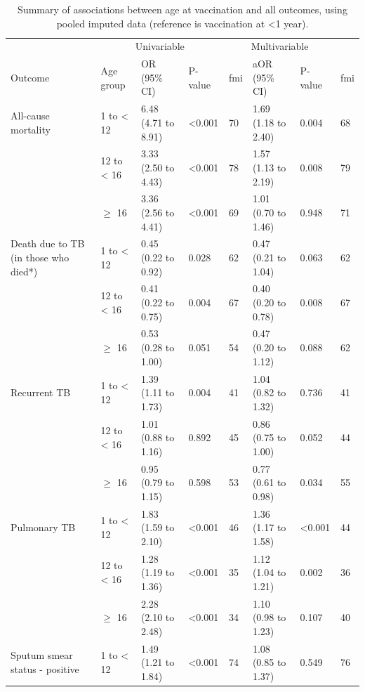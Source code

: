 \documentclass[11pt,twoside]{bristolthesis}
\begin{document}
  \begin{table}[H][H]
  
  \caption[Summary of associations between age at vaccination and all outcomes, using pooled imputed data (reference is vaccination at <1 year).]{\label{tab:06-imp-ageatvac}Summary of associations between age at vaccination and all outcomes, using pooled imputed data (reference is vaccination at <1 year).}
  \centering
  \fontsize{8}{10}\selectfont
  \begin{tabular}{>{\raggedright\arraybackslash}p{3cm}lllllll}
  \toprule
  \multicolumn{2}{c}{ } & \multicolumn{3}{c}{Univariable} & \multicolumn{3}{c}{Multivariable} \\
  \cmidrule(l{3pt}r{3pt}){3-5} \cmidrule(l{3pt}r{3pt}){6-8}
  Outcome & Age group & OR (95\% CI) & P-value & fmi & aOR (95\% CI) & P-value & fmi\\
  \midrule
  All-cause mortality & 1 to < 12 & 6.48 (4.71 to 8.91) & <0.001 & 70 & 1.69 (1.18 to 2.40) & 0.004 & 68\\
   & 12 to < 16 & 3.33 (2.50 to 4.43) & <0.001 & 78 & 1.57 (1.13 to 2.19) & 0.008 & 79\\
   & $\geq$ 16 & 3.36 (2.56 to 4.41) & <0.001 & 69 & 1.01 (0.70 to 1.46) & 0.948 & 71\\
  Death due to TB (in those who died*) & 1 to < 12 & 0.45 (0.22 to 0.92) & 0.028 & 62 & 0.47 (0.21 to 1.04) & 0.063 & 62\\
   & 12 to < 16 & 0.41 (0.22 to 0.75) & 0.004 & 67 & 0.40 (0.20 to 0.78) & 0.008 & 67\\
  \addlinespace
   & $\geq$ 16 & 0.53 (0.28 to 1.00) & 0.051 & 54 & 0.47 (0.20 to 1.12) & 0.088 & 62\\
  Recurrent TB & 1 to < 12 & 1.39 (1.11 to 1.73) & 0.004 & 41 & 1.04 (0.82 to 1.32) & 0.736 & 41\\
   & 12 to < 16 & 1.01 (0.88 to 1.16) & 0.892 & 45 & 0.86 (0.75 to 1.00) & 0.052 & 44\\
   & $\geq$ 16 & 0.95 (0.79 to 1.15) & 0.598 & 53 & 0.77 (0.61 to 0.98) & 0.034 & 55\\
  Pulmonary TB & 1 to < 12 & 1.83 (1.59 to 2.10) & <0.001 & 46 & 1.36 (1.17 to 1.58) & <0.001 & 44\\
  \addlinespace
   & 12 to < 16 & 1.28 (1.19 to 1.36) & <0.001 & 35 & 1.12 (1.04 to 1.21) & 0.002 & 36\\
   & $\geq$ 16 & 2.28 (2.10 to 2.48) & <0.001 & 34 & 1.10 (0.98 to 1.23) & 0.107 & 40\\
  Sputum smear status - positive & 1 to < 12 & 1.49 (1.21 to 1.84) & <0.001 & 74 & 1.08 (0.85 to 1.37) & 0.549 & 76\\

\end{tabular}
\end{table}
\end{document}
